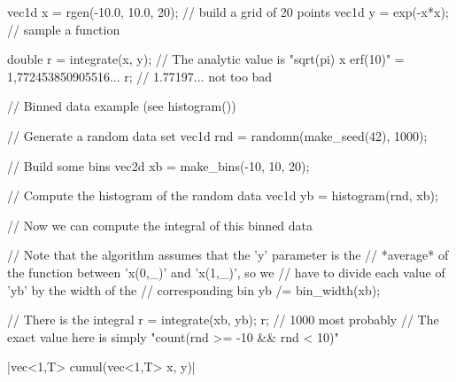 \begin{example}
\begin{cppcode}
vec1d x = rgen(-10.0, 10.0, 20); // build a grid of 20 points
vec1d y = exp(-x*x);             // sample a function

double r = integrate(x, y);
// The analytic value is "sqrt(pi) x erf(10)" = 1,772453850905516...
r; // 1.77197... not too bad

// Binned data example (see histogram())

// Generate a random data set
vec1d rnd = randomn(make_seed(42), 1000);

// Build some bins
vec2d xb = make_bins(-10, 10, 20);

// Compute the histogram of the random data
vec1d yb = histogram(rnd, xb);

// Now we can compute the integral of this binned data

// Note that the algorithm assumes that the 'y' parameter is the
// *average* of the function between 'x(0,_)' and 'x(1,_)', so we
// have to divide each value of 'yb' by the width of the
// corresponding bin
yb /= bin_width(xb);

// There is the integral
r = integrate(xb, yb);
r; // 1000 most probably
// The exact value here is simply "count(rnd >= -10 && rnd < 10)"
\end{cppcode}
\end{example}


\funcitem \cppinline|vec<1,T> cumul(vec<1,T> x, y)| 
